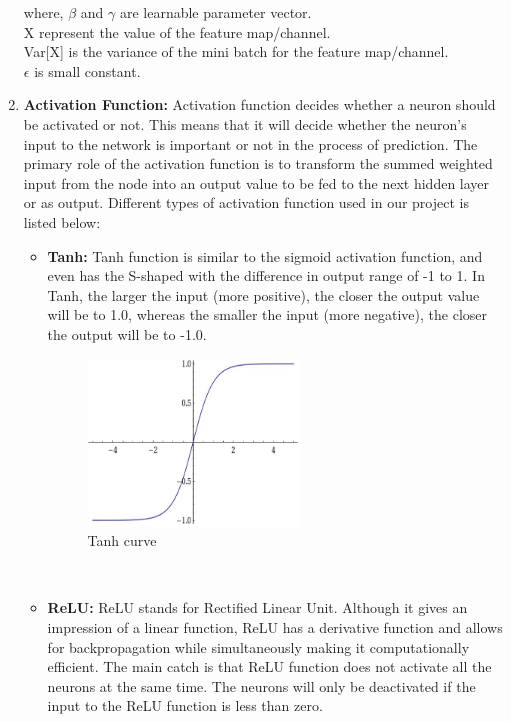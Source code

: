 \begin{enumerate}
        where, $\beta$ and $\gamma$ are learnable parameter vector. \\ 
        X represent the value of the feature map/channel.\\
        Var[X] is the variance of the mini batch for the feature map/channel.\\
        $\epsilon$ is small constant.\\
        \item {\bf Activation Function:} Activation function decides whether a neuron should be activated or not. This means that it will decide whether the neuron’s input to the network is important or not in the process of prediction. The primary role of the activation function is to transform the summed weighted input from the node into an output value to be fed to the next hidden layer or as output. Different types of activation function used in our project is listed below:
        \begin{itemize}
            \item {\bf Tanh:} Tanh function is similar to the sigmoid activation function, and even has the S-shaped with the difference in output range of -1 to 1. In Tanh, the larger the input (more positive), the closer the output value will be to 1.0, whereas the smaller the input (more negative), the closer the output will be to -1.0. 
            \begin{figure}[ht]
                \centering
                \includegraphics[width=2.2in]{./figures/tanhcurve.png}
                \caption{ Tanh curve}
            \end{figure} \\
            \item {\bf ReLU:} ReLU stands for Rectified Linear Unit. Although it gives an impression of a linear function, ReLU has a derivative function and allows for backpropagation while simultaneously making it computationally efficient. The main catch is that ReLU function does not activate all the neurons at the same time. The neurons will only be deactivated if the input to the ReLU function is less than zero. \cite{r6}

\end{itemize}
\end{enumerate}
